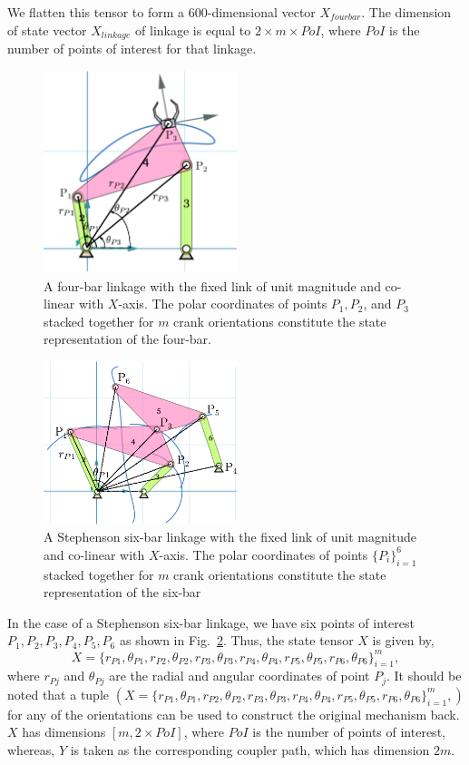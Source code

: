 We flatten this tensor to form a 600-dimensional vector $X_{fourbar}$.
The dimension of state vector $X_{linkage}$ of linkage is equal to $2\times m \times PoI$, where $PoI$ is the number of points of interest for that linkage.


\begin{figure}
\centering
\includegraphics[width=160pt]{jmd-19/figure/fig_fourbar_state.eps}
  \caption{A four-bar linkage with the fixed link of unit magnitude and co-linear with $X$-axis. The polar coordinates of points $P_1, P_2$, and $P_3$ stacked together for $m$ crank orientations constitute the state representation of the four-bar.}
\label{fig_fourbar_state}
\end{figure}


\begin{figure}
\centering
\includegraphics[width=160pt]{jmd-19/figure/fig_sixbar_state.eps}
  \caption{A Stephenson six-bar linkage with the fixed link of unit magnitude and co-linear with $X$-axis. The polar coordinates of points $\{P_i\}_{i=1}^6$ stacked together for $m$ crank orientations constitute the state representation of the six-bar}
\label{fig_sixbar_state}
\end{figure}

In the case of a Stephenson six-bar linkage, we have six points of interest $P_1, P_2, P_3, P_4, P_5, P_6$ as shown in Fig.~\ref{fig_sixbar_state}.
Thus, the state tensor $X$ is given by,
\begin{equation}
  X = \{ r_{P1}, \theta_{P1}, r_{P2}, \theta_{P2}, r_{P3}, \theta_{P3}, r_{P4}, \theta_{P4}, r_{P5}, \theta_{P5}, r_{P6}, \theta_{P6}\}_{i=1}^m,
\end{equation}
where $r_{Pj}$ and $\theta_{Pj}$ are the radial and angular coordinates of point $P_j$. It should be noted that a tuple $(X = \{ r_{P1}, \theta_{P1}, r_{P2}, \theta_{P2}, r_{P3}, \theta_{P3}, r_{P4}, \theta_{P4}, r_{P5}, \theta_{P5}, r_{P6}, \theta_{P6}\}_{i=1}^m,)$ for any of the orientations can be used to construct the original mechanism back.
$X$ has dimensions $[m, 2 \times PoI]$, where $PoI$ is the number of points of interest, whereas, $Y$ is taken as the corresponding coupler path, which has dimension $2m$.


